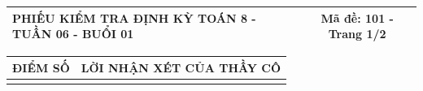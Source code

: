 \documentclass[12pt,a4paper]{article}
\begin{document}
\pagestyle{empty}

\noindent
\begin{tabularx}{\linewidth}{|X|c|}
\hline
\textbf{PHIẾU KIỂM TRA ĐỊNH KỲ TOÁN 8 - TUẦN 06 - BUỔI 01} & \textbf{Mã đề: 101 - Trang 1/2} \\
\hline
\end{tabularx}

\vspace{1mm}

\noindent
\begin{tabularx}{\linewidth}{|p{3.2cm}|X|}
\hline
\centering\textbf{ĐIỂM SỐ} & \centering\textbf{LỜI NHẬN XÉT CỦA THẦY CÔ} \tabularnewline
\hline
\rule{0pt}{1.8cm} & \tabularnewline
\hline
\end{tabularx}

\vspace{1.2mm}
\end{document}
